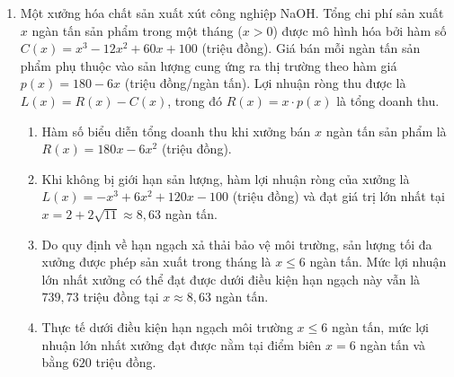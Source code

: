 \documentclass[12pt,a4paper]{article}
\begin{document}
\begin{enumerate}[label=\textbf{Câu \arabic*:}, leftmargin=*]

\item Một xưởng hóa chất sản xuất xút công nghiệp NaOH. Tổng chi phí sản xuất $x$ ngàn tấn sản phẩm trong một tháng ($x > 0$) được mô hình hóa bởi hàm số $C(x) = x^3 - 12x^2 + 60x + 100$ (triệu đồng). Giá bán mỗi ngàn tấn sản phẩm phụ thuộc vào sản lượng cung ứng ra thị trường theo hàm giá $p(x) = 180 - 6x$ (triệu đồng/ngàn tấn). Lợi nhuận ròng thu được là $L(x) = R(x) - C(x)$, trong đó $R(x) = x \cdot p(x)$ là tổng doanh thu.

\begin{enumerate}[label=\alph*)]
    \item Hàm số biểu diễn tổng doanh thu khi xưởng bán $x$ ngàn tấn sản phẩm là $R(x) = 180x - 6x^2$ (triệu đồng).
    \item Khi không bị giới hạn sản lượng, hàm lợi nhuận ròng của xưởng là $L(x) = -x^3 + 6x^2 + 120x - 100$ (triệu đồng) và đạt giá trị lớn nhất tại $x = 2 + 2\sqrt{11} \approx 8{,}63$ ngàn tấn.
    \item Do quy định về hạn ngạch xả thải bảo vệ môi trường, sản lượng tối đa xưởng được phép sản xuất trong tháng là $x \le 6$ ngàn tấn. Mức lợi nhuận lớn nhất xưởng có thể đạt được dưới điều kiện hạn ngạch này vẫn là $739{,}73$ triệu đồng tại $x \approx 8{,}63$ ngàn tấn.
    \item Thực tế dưới điều kiện hạn ngạch môi trường $x \le 6$ ngàn tấn, mức lợi nhuận lớn nhất xưởng đạt được nằm tại điểm biên $x = 6$ ngàn tấn và bằng $620$ triệu đồng.
\end{enumerate}


\end{enumerate}
\end{document}
